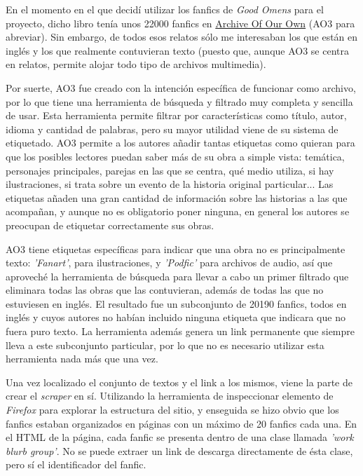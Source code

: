 \documentclass{pre-tfg}
\begin{document}
En el momento en el que decidí utilizar los fanfics de \textit{Good Omens} para el proyecto, dicho libro tenía unos 22000 fanfics en \href{archiveofourown.org}{Archive Of Our Own} (AO3 para abreviar). Sin embargo, de todos esos relatos sólo me interesaban los que están en inglés y los que realmente contuvieran texto (puesto que, aunque AO3 se centra en relatos, permite alojar todo tipo de archivos multimedia).

Por suerte, AO3 fue creado con la intención específica de funcionar como archivo, por lo que tiene una herramienta de búsqueda y filtrado muy completa y sencilla de usar. Esta herramienta permite filtrar por características como título, autor, idioma y cantidad de palabras, pero su mayor utilidad viene de su sistema de etiquetado. AO3 permite a los autores añadir tantas etiquetas como quieran para que los posibles lectores puedan saber más de su obra a simple vista: temática, personajes principales, parejas en las que se centra, qué medio utiliza, si hay ilustraciones, si trata sobre un evento de la historia original particular... Las etiquetas añaden una gran cantidad de información sobre las historias a las que acompañan, y aunque no es obligatorio poner ninguna, en general los autores se preocupan de etiquetar correctamente sus obras.

AO3 tiene etiquetas específicas para indicar que una obra no es principalmente texto: \textit{'Fanart'}, para ilustraciones, y \textit{'Podfic'} para archivos de audio, así que aproveché la herramienta de búsqueda para llevar a cabo un primer filtrado que eliminara todas las obras que las contuvieran, además de todas las que no estuviesen en inglés. El resultado fue un subconjunto de 20190 fanfics, todos en inglés y cuyos autores no habían incluido ninguna etiqueta que indicara que no fuera puro texto. La herramienta además genera un link permanente que siempre lleva a este subconjunto particular, por lo que no es necesario utilizar esta herramienta nada más que una vez.

Una vez localizado el conjunto de textos y el link a los mismos, viene la parte de crear el \textit{scraper} en sí. Utilizando la herramienta de inspeccionar elemento de \textit{Firefox} para explorar la estructura del sitio, y enseguida se hizo obvio que los fanfics estaban organizados en páginas con un máximo de 20 fanfics cada una. En el HTML de la página, cada fanfic se presenta dentro de una clase llamada \textit{'work blurb group'}. No se puede extraer un link de descarga directamente de ésta clase, pero sí el identificador del fanfic.
\end{document}
